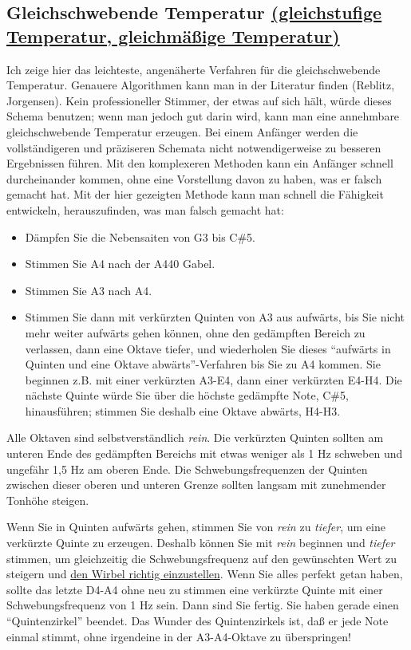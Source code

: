 \label{c2_6d}
\label{c2_6_et}

\subsection{Gleichschwebende Temperatur \hyperref[et]{(gleichstufige Temperatur, gleichmäßige
 Temperatur)}}

Ich zeige hier das leichteste, angenäherte Verfahren für die gleichschwebende Temperatur.
Genauere Algorithmen kann man in der Literatur finden (Reblitz, Jorgensen).
Kein professioneller Stimmer, der etwas auf sich hält, würde dieses Schema benutzen; wenn man jedoch gut darin wird, kann man eine annehmbare gleichschwebende Temperatur erzeugen.
Bei einem Anfänger werden die vollständigeren und präziseren Schemata nicht notwendigerweise zu besseren Ergebnissen führen.
Mit den komplexeren Methoden kann ein Anfänger schnell durcheinander kommen, ohne eine Vorstellung davon zu haben, was er falsch gemacht hat.
Mit der hier gezeigten Methode kann man schnell die Fähigkeit entwickeln, herauszufinden, was man falsch gemacht hat:

\begin{itemize} 
 \item Dämpfen Sie die Nebensaiten von G3 bis C\#5.
 \item Stimmen Sie A4 nach der A440 Gabel.
 \item Stimmen Sie A3 nach A4.
 \item Stimmen Sie dann mit verkürzten Quinten von A3 aus aufwärts, bis Sie nicht mehr weiter aufwärts gehen können, ohne den gedämpften Bereich zu verlassen, dann eine Oktave tiefer, und wiederholen Sie dieses \enquote{aufwärts in Quinten und eine Oktave abwärts}-Verfahren bis Sie zu A4 kommen.
Sie beginnen z.B. mit einer verkürzten A3-E4, dann einer verkürzten E4-H4.
Die nächste Quinte würde Sie über die höchste gedämpfte Note, C\#5, hinausführen; stimmen Sie deshalb eine Oktave abwärts, H4-H3.
\end{itemize}

Alle Oktaven sind selbstverständlich \textit{rein}.
Die verkürzten Quinten sollten am unteren Ende des gedämpften Bereichs mit etwas weniger als 1 Hz schweben und ungefähr 1,5 Hz am oberen Ende.
Die Schwebungsfrequenzen der Quinten zwischen dieser oberen und unteren Grenze sollten langsam mit zunehmender Tonhöhe steigen.

Wenn Sie in Quinten aufwärts gehen, stimmen Sie von \textit{rein} zu \textit{tiefer}, um eine verkürzte Quinte zu erzeugen.
Deshalb können Sie mit \textit{rein} beginnen und \textit{tiefer} stimmen, um gleichzeitig die Schwebungsfrequenz auf den gewünschten Wert zu steigern und \hyperref[c2_5_wirb]{den Wirbel richtig einzustellen}.
Wenn Sie alles perfekt getan haben, sollte das letzte D4-A4 ohne neu zu stimmen eine verkürzte Quinte mit einer Schwebungsfrequenz von 1 Hz sein.
Dann sind Sie fertig.
Sie haben gerade einen \enquote{Quintenzirkel} beendet.
Das Wunder des Quintenzirkels ist, daß er jede Note einmal stimmt, ohne irgendeine in der A3-A4-Oktave zu überspringen!

